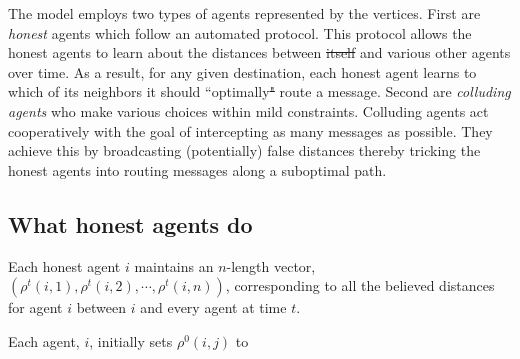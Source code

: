 \documentclass{comnet}
\providecommand{\DIFadd}[1]{{\protect\color{blue}\uwave{#1}}} %
\providecommand{\DIFdel}[1]{{\protect\color{red}\sout{#1}}}                      %
\providecommand{\DIFaddbegin}{} %
\providecommand{\DIFaddend}{} %
\providecommand{\DIFdelbegin}{} %
\providecommand{\DIFdelend}{} %
\begin{document}
The model employs two types of agents represented by the vertices. First are
{\it honest} agents which follow an automated protocol. This protocol allows
the honest agents to learn about the distances between \DIFdelbegin \DIFdel{itself }\DIFdelend \DIFaddbegin \DIFadd{themselves }\DIFaddend and various
other agents over time. As a result, for any given destination, each honest
agent learns to which of its neighbors it should ``optimally\DIFdelbegin \DIFdel{" }\DIFdelend \DIFaddbegin \DIFadd{'' }\DIFaddend route a message.
Second are {\it colluding agents} who make various choices within mild
constraints. Colluding agents act cooperatively with the goal of intercepting
as many messages as possible. They achieve this by broadcasting (potentially)
false distances thereby tricking the honest agents into routing messages along
a suboptimal path.

\DIFdelbegin %




\DIFdelend \subsection{What honest agents do} \label{sec:synchronization}

Each honest agent $i$ maintains an $n$-length vector, $(\rho^t(i,1),
\rho^t(i,2),\cdots,\rho^t(i,n))$, corresponding to all the believed distances
for agent $i$ between $i$ and every agent at time $t$.

Each agent, $i$, initially sets $\rho^0(i,j)$ to
\end{document}

